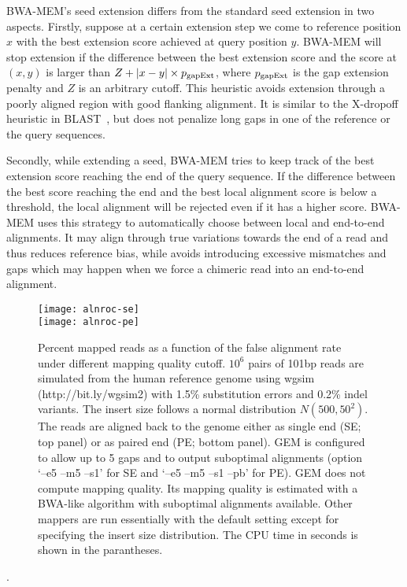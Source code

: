 \documentclass{bioinfo}
\begin{document}
\begin{methods}
BWA-MEM's seed extension differs from the standard seed extension in two
aspects. Firstly, suppose at a certain extension step we come to reference
position $x$ with the best extension score achieved at query position $y$.
BWA-MEM will stop extension if the difference between the best extension score
and the score at $(x,y)$ is larger than $Z+|x-y|\times p_{\rm gapExt}$, where
$p_{\rm gapExt}$ is the gap extension penalty and $Z$ is an arbitrary cutoff.
This heuristic avoids extension through a poorly aligned region with good
flanking alignment. It is similar to the X-dropoff heuristic in
BLAST~\citep{Altschul:1997vn}, but does not penalize long gaps in one of the
reference or the query sequences.

Secondly, while extending a seed, BWA-MEM tries to keep track of the best
extension score reaching the end of the query sequence. If the difference
between the best score reaching the end and the best local alignment score is
below a threshold, the local alignment will be rejected even if it has a higher
score. BWA-MEM uses this strategy to automatically choose between local and
end-to-end alignments. It may align through true variations towards the end of
a read and thus reduces reference bias, while avoids introducing excessive
mismatches and gaps which may happen when we force a chimeric read into an
end-to-end alignment.

\begin{figure}[tb]
\centering
\texttt{[image: alnroc-se]}\\
\texttt{[image: alnroc-pe]}
\caption{Percent mapped reads as a function of the false alignment rate under
different mapping quality cutoff. $10^6$ pairs of 101bp reads are simulated
from the human reference genome using wgsim (http://bit.ly/wgsim2) with 1.5\%
substitution errors and 0.2\% indel variants. The insert size follows a normal
distribution $N(500,50^2)$. The reads are aligned back to the genome either as
single end (SE; top panel) or as paired end (PE; bottom panel). GEM is
configured to allow up to 5 gaps and to output suboptimal alignments (option
`--e5 --m5 --s1' for SE and `--e5 --m5 --s1 --pb' for PE). GEM does not compute
mapping quality. Its mapping quality is estimated with a BWA-like algorithm
with suboptimal alignments available. Other mappers are run essentially with
the default setting except for specifying the insert size distribution. The CPU
time in seconds is shown in the parantheses.}\label{fig:eval}
\end{figure}.


\end{methods}
\end{document}
